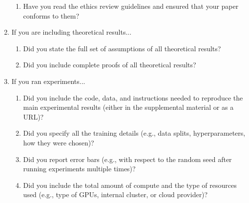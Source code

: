 \documentclass{article}
\begin{document}
\begin{enumerate}
\begin{enumerate}
    
  \item Have you read the ethics review guidelines and ensured that your paper conforms to them?
\end{enumerate}

\item If you are including theoretical results...
\begin{enumerate}
  \item Did you state the full set of assumptions of all theoretical results?
	\item Did you include complete proofs of all theoretical results?
\end{enumerate}

\item If you ran experiments...
\begin{enumerate}
  \item Did you include the code, data, and instructions needed to reproduce the main experimental results (either in the supplemental material or as a URL)?
    
  \item Did you specify all the training details (e.g., data splits, hyperparameters, how they were chosen)?
    
	\item Did you report error bars (e.g., with respect to the random seed after running experiments multiple times)?
    
	\item Did you include the total amount of compute and the type of resources used (e.g., type of GPUs, internal cluster, or cloud provider)?
\end{enumerate}


\end{enumerate}
\end{document}
